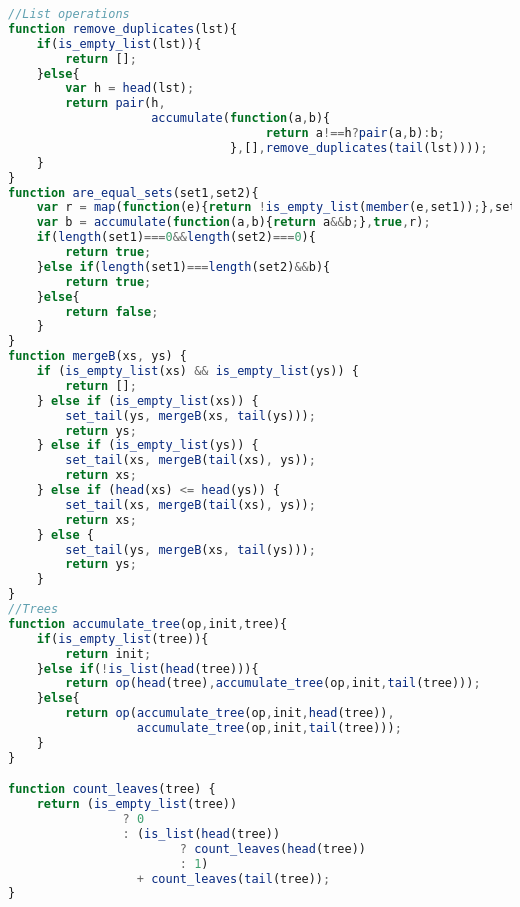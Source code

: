 \documentclass[11pt]{article}
\begin{document}
\begin{lstlisting}[language=JavaScript]
//List operations
function remove_duplicates(lst){
    if(is_empty_list(lst)){
        return [];
    }else{
        var h = head(lst);
        return pair(h,
        			accumulate(function(a,b){
        							return a!==h?pair(a,b):b;
        					   },[],remove_duplicates(tail(lst))));
    }
}
function are_equal_sets(set1,set2){
    var r = map(function(e){return !is_empty_list(member(e,set1));},set2);
    var b = accumulate(function(a,b){return a&&b;},true,r);
    if(length(set1)===0&&length(set2)===0){
        return true;
    }else if(length(set1)===length(set2)&&b){
        return true;
    }else{
        return false;
    }
}
function mergeB(xs, ys) {
	if (is_empty_list(xs) && is_empty_list(ys)) {
		return [];
	} else if (is_empty_list(xs)) {
		set_tail(ys, mergeB(xs, tail(ys)));
		return ys;
	} else if (is_empty_list(ys)) {
		set_tail(xs, mergeB(tail(xs), ys));
		return xs;
	} else if (head(xs) <= head(ys)) {
		set_tail(xs, mergeB(tail(xs), ys));
		return xs;
	} else {
		set_tail(ys, mergeB(xs, tail(ys)));
		return ys;
	}
}
//Trees
function accumulate_tree(op,init,tree){
  	if(is_empty_list(tree)){
    	return init;
  	}else if(!is_list(head(tree))){
    	return op(head(tree),accumulate_tree(op,init,tail(tree)));
  	}else{
    	return op(accumulate_tree(op,init,head(tree)),
    		      accumulate_tree(op,init,tail(tree)));
  	}
}

function count_leaves(tree) {
	return (is_empty_list(tree))
				? 0
				: (is_list(head(tree))
						? count_leaves(head(tree))
						: 1)
				  + count_leaves(tail(tree));
}


\end{lstlisting}
\end{document}
